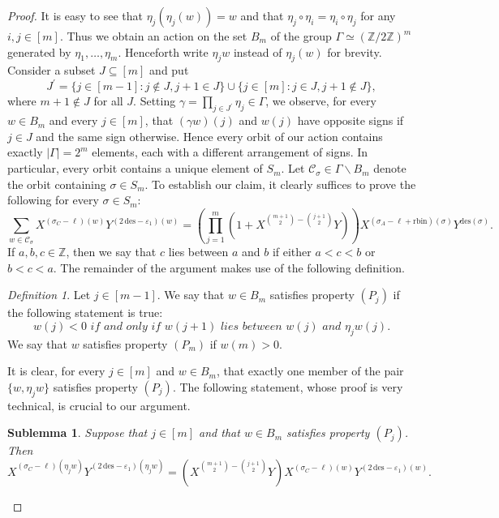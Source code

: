 \documentclass[11pt,a4paper]{amsart}
\theoremstyle{plain}
\newtheorem{sublemma}[thm]{Sublemma}
\theoremstyle{remark}
\newtheorem{dfn}[thm]{Definition}
\newcommand{\Z}{\mathbb{Z}}
\begin{document}
\begin{proof}
It is easy to see that $\eta_j(\eta_j(w)) = w$ and that $\eta_j \circ \eta_i = \eta_i \circ \eta_j$ for any $i,j \in [m]$.  Thus we obtain an action on the set $B_m$ of the group $\Gamma \simeq (\Z / 2\Z)^m$ generated by $\eta_1, \dots, \eta_m$.  Henceforth write $\eta_j w$ instead of $\eta_j(w)$ for brevity.  Consider a subset $J \subseteq [m]$ and put
$$ J^\prime = \{ j \in [m-1] : j \not\in J, j + 1 \in J \} \cup \{ j \in [m] : j \in J, j + 1 \not\in J \},$$
where $m + 1 \not\in J$ for all $J$.  Setting $\gamma = \prod_{j \in J^\prime} \eta_j \in  \Gamma$, we observe, for every $w \in B_m$ and every $j \in [m]$, that $(\gamma w)(j)$ and $w(j)$ have opposite signs if $j \in J$ and the same sign otherwise.  Hence every orbit of our action contains exactly $| \Gamma | = 2^m$ elements, each with a different arrangement of signs.  In particular, every orbit contains a unique element of $S_m$.  Let $\mathcal{C}_\sigma \in \Gamma \backslash B_m$ denote the orbit containing $\sigma \in S_m$.  To establish our claim, it clearly suffices to prove the following for every $\sigma \in S_m$:
\begin{equation} \label{equ:orbit.equation}
\sum_{w \in \mathcal{C}_\sigma} X^{(\sigma_C - \ell)(w)} Y^{(2 \,\mathrm{des} - \varepsilon_1)(w)} \! = \!\left( \prod_{j = 1}^m (1 + X^{\binom{m+1}{2} - \binom{j+1}{2}} Y)\! \right) \! X^{(\sigma_A - \ell + \mathrm{rbin})(\sigma)} Y^{\mathrm{des}(\sigma)}.
\end{equation}
If $a,b,c \in \Z$, then we say that $c$ lies between $a$ and $b$ if either $a < c < b$ or $b < c < a$.
The remainder of the argument makes use of the following definition.
\begin{dfn} \label{def:property.pj}
Let $j \in [m-1]$.  We say that $w \in B_m$ satisfies property $(P_j)$ if the following statement is true:
$$ w(j) < 0  \textit{ if and only if } w(j+1) \textit{ lies between } w(j) \textit{ and } \eta_jw (j).$$
We say that $w$ satisfies property $(P_m)$ if $w(m) > 0$.  
\end{dfn}
It is clear, for every $j \in [m]$ and $w \in B_m$, that exactly one member of the pair $\{ w, \eta_jw \}$ satisfies property $(P_j)$.  The following statement, whose proof is very technical, is crucial to our argument.

\begin{sublemma} \label{bm.claim}
Suppose that $j \in [m]$ and that $w \in B_m$ satisfies property $(P_j)$.  Then
\begin{equation*}
X^{(\sigma_C - \ell)(\eta_j w)} Y^{(2 \,\mathrm{des} - \varepsilon_1)(\eta_j w)} =  \left(X^{\binom{m+1}{2} - \binom{j+1}{2}} Y \right) X^{(\sigma_C - \ell)(w)} Y^{(2 \,\mathrm{des} - \varepsilon_1)(w)}.
\end{equation*}
\end{sublemma}


\end{proof}
\end{document}
